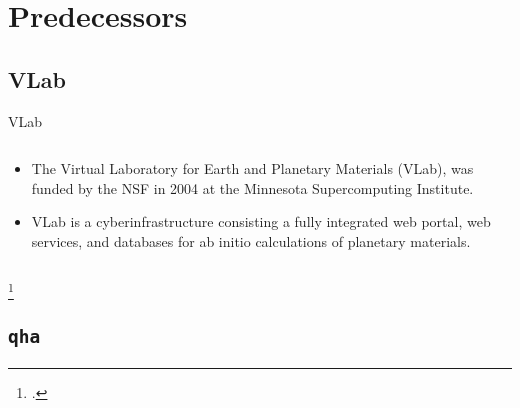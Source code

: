 \section{Predecessors}

\subsection{VLab}

\begin{frame}{VLab}
    \begin{columns}[t]
        \begin{column}{0.4\textwidth}
            \begin{itemize}
                \item The Virtual Laboratory for Earth and Planetary Materials (VLab), was
                      funded by the NSF in 2004 at the Minnesota Supercomputing Institute.
                \item VLab is a cyberinfrastructure consisting a fully integrated web
                      portal, web services, and databases for ab initio calculations of
                      planetary materials.
            \end{itemize}
        \end{column}

        \begin{column}{0.6\textwidth}
        \end{column}
    \end{columns}
    \footcitetext{DASILVA2007321}

\end{frame}

\subsection{\texttt{qha}}


